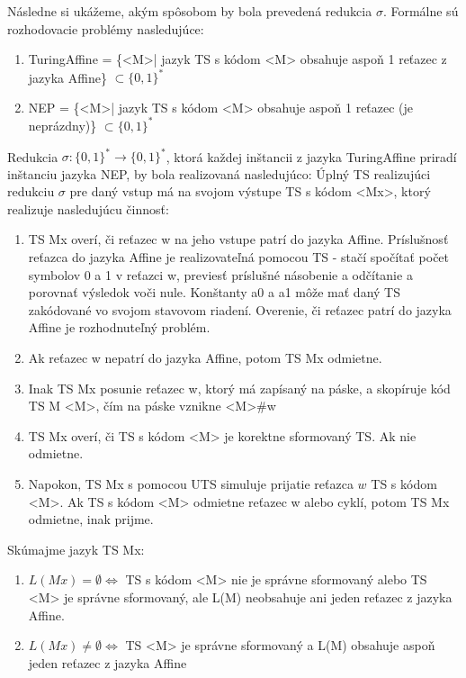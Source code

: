 \documentclass[10pt]{article}
\begin{document}
Následne si ukážeme, akým spôsobom by bola prevedená redukcia $\sigma$.
Formálne sú rozhodovacie problémy nasledujúce:
\begin{enumerate}
    \item TuringAffine = \{<M>| jazyk TS s kódom <M> obsahuje aspoň 1 reťazec z jazyka Affine\}
        $\subset \{0,1\}^*$ 
    \item NEP = \{<M>| jazyk TS s kódom <M> obsahuje aspoň 1  reťazec (je neprázdny)\} $\subset \{0,1\}^*$ 
\end{enumerate}

Redukcia $\sigma: \{0,1\}^* \to \{0,1\}^*$, ktorá každej inštancii z jazyka TuringAffine priradí
inštanciu jazyka NEP, by bola realizovaná nasledujúco:
Úplný TS realizujúci redukciu $\sigma$ pre daný vstup má na svojom výstupe TS s kódom <Mx>, ktorý
realizuje nasledujúcu činnosť:
\begin{enumerate}
    \item TS Mx overí, či reťazec w na jeho vstupe patrí do jazyka Affine. Príslušnosť reťazca do
        jazyka Affine je realizovateľná pomocou TS - stačí spočítať počet symbolov 0 a 1 v reťazci
        w, previesť príslušné násobenie a odčítanie a porovnať výsledok voči nule. Konštanty
        a0 a a1 môže mať daný TS zakódované vo svojom stavovom riadení. Overenie, či reťazec patrí do jazyka
        Affine je rozhodnuteľný problém. 
    \item Ak reťazec w nepatrí do jazyka Affine, potom TS Mx odmietne.
    \item Inak TS Mx posunie reťazec w, ktorý má zapísaný na páske, a skopíruje kód
        TS M <M>, čím na páske vznikne <M>\#w
    \item TS Mx overí, či TS s kódom <M> je korektne sformovaný TS. Ak nie odmietne.
    \item Napokon, TS Mx s pomocou UTS simuluje prijatie reťazca $w$ TS s kódom <M>. Ak TS s kódom <M>
        odmietne reťazec w alebo cyklí, potom TS Mx odmietne, inak prijme.
\end{enumerate}
Skúmajme jazyk TS Mx:
\begin{enumerate}
    \item $L(Mx) = \emptyset \iff$ TS s kódom <M> nie je správne sformovaný alebo TS <M> je správne
        sformovaný, ale L(M) neobsahuje ani jeden reťazec z jazyka Affine.
    \item $L(Mx) \neq \emptyset \iff$ TS <M> je správne sformovaný a L(M) obsahuje aspoň jeden reťazec
        z jazyka Affine
\end{enumerate}
\end{document}
